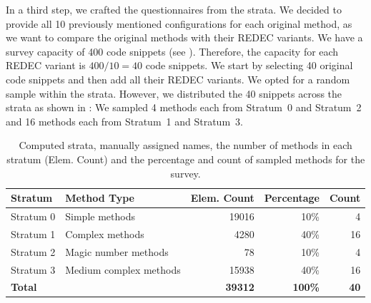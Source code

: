 \documentclass[%
class=scrreprt,
chapterprefix=false,%
open=right,%
twoside=false,%
paper=a4,%
logofile={Logo\_zentral\_farbig\_EN.png},%
thesistype=master,%
UKenglish,%
]{se2thesis}
\theoremstyle{definition}
\newcommand{\numOriginal}{39312\xspace}
\newcommand{\rdh}{REDEC\xspace}
\begin{document}
	In a third step, we crafted the questionnaires from the strata. We decided to provide all 10 previously mentioned configurations for each original method, as we want to compare the original methods with their \rdh variants. We have a survey capacity of 400 code snippets (see ). Therefore, the capacity for each \rdh variant is $400/10 = 40$ code snippets. We start by selecting 40 original code snippets and then add all their \rdh variants.
	We opted for a random sample within the strata. However, we distributed the 40 snippets across the strata as shown in :
	We sampled 4 methods each from Stratum~0 and Stratum~2 and 16 methods each from Stratum~1 and Stratum~3.
	
%
	
	\begin{table}[tb]
		\centering
		\caption{Computed strata, manually assigned names, the number of methods in each stratum (Elem. Count) and the percentage and count of sampled methods for the survey.}
		\vspace{8pt}
		\label{tab:strata_info}
		\begin{tabular}{llrrr}
			\toprule
			Stratum & Method Type & Elem. Count & Percentage & Count \\
			\midrule
			Stratum 0 & Simple methods & 19016 & 10\% & 4 \\
			Stratum 1 & Complex methods & 4280 & 40\% & 16 \\
			Stratum 2 & Magic number methods & 78 & 10\% & 4 \\
			Stratum 3 & Medium complex methods & 15938 & 40\% & 16 \\
			\midrule
			\textbf{Total} & & \textbf{\numOriginal} & \textbf{100\%} & \textbf{40} \\
			\bottomrule
		\end{tabular}
	\end{table}
	
\end{document}
